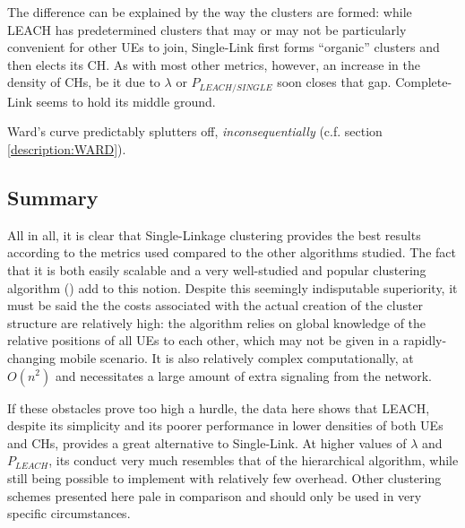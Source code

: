 The difference can be explained by the way the clusters are formed: while LEACH has predetermined clusters that may or may not be particularly convenient for other UEs to join, Single-Link first forms ``organic'' clusters and then elects its CH. As with most other metrics, however, an increase in the density of CHs, be it due to $\lambda$ or $P_{LEACH/SINGLE}$ soon closes that gap. Complete-Link seems to hold its middle ground.

Ward's curve predictably splutters off, \textit{inconsequentially} (c.f. section \ref{description:WARD}).

\subsection{Summary}

All in all, it is clear that Single-Linkage clustering provides the best results according to the metrics used compared to the other algorithms studied. The fact that it is both easily scalable and a very well-studied and popular clustering algorithm (\cite{Everitt2011}) add to this notion. Despite this seemingly indisputable superiority, it must be said the the costs associated with the actual creation of the cluster structure are relatively high: the algorithm relies on global knowledge of the relative positions of all UEs to each other, which may not be given in a rapidly-changing mobile scenario. It is also relatively complex computationally, at $O(n^2)$ and necessitates a large amount of extra signaling from the network.

If these obstacles prove too high a hurdle, the data here shows that LEACH, despite its simplicity and its poorer performance in lower densities of both UEs and CHs, provides a great alternative to Single-Link. At higher values of $\lambda$ and $P_{LEACH}$, its conduct very much resembles that of the hierarchical algorithm, while still being possible to implement with relatively few overhead. Other clustering schemes presented here pale in comparison and should only be used in very specific circumstances.